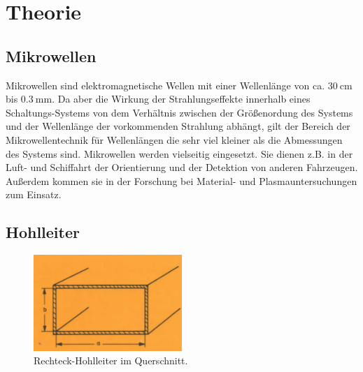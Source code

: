 \section{Theorie}
\label{sec:Theorie}



\subsection{Mikrowellen}

Mikrowellen sind elektromagnetische Wellen mit einer Wellenlänge von ca. $\SI{30}{\centi\m}$ bis $\SI{0.3}{\milli\m}$. Da aber die Wirkung der Strahlungseffekte innerhalb eines Schaltungs-Systems von dem Verhältnis zwischen der Größenordung des Systems und der Wellenlänge der vorkommenden Strahlung abhängt, gilt der Bereich der Mikrowellentechnik für Wellenlängen die sehr viel kleiner als die Abmessungen des Systems sind. Mikrowellen werden vielseitig eingesetzt. Sie dienen z.B. in der Luft- und Schiffahrt der Orientierung und der Detektion von anderen Fahrzeugen. Außerdem kommen sie in der Forschung bei Material- und Plasmauntersuchungen zum Einsatz. 

\subsection{Hohlleiter}


\begin{figure}
    \centering
    \includegraphics[width=0.5\textwidth]{Bilder/hohlleiter_querschnitt.PNG}
    \caption{Rechteck-Hohlleiter im Querschnitt.\cite{Mikrowellen}}
    \label{fig:hohlleiter}
\end{figure}



